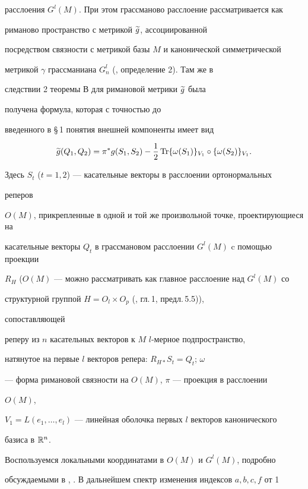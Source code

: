 расслоения $G^l(M)$. При этом грассманово расслоение рассматривается как


риманово пространство с метрикой $\widetilde {g}$, ассоциированной


посредством связности с метрикой базы $M$ и канонической симметрической


метрикой $\gamma $ грассманиана $G^l_n$ (\cite{Far1}, определение 2). Там же в


следствии 2 теоремы В для римановой метрики $\widetilde {g}$ была


получена формула, которая с точностью до


введенного в \S\,1 понятия внешней компоненты имеет вид


\begin{equation}


\g g(Q_1,Q_2)=\pi ^\ast g(S_1,S_2)-\1 \Tr \{ \omega (S_1)


\} _{V_1}\circ \{ \omega (S_2)\} _{V_1}.


\end{equation}


Здесь $S_t$ ($t=1,2$) --- касательные векторы в расслоении ортонормальных


реперов


$O(M)$, прикрепленные в одной и той же произвольной точке, проектирующиеся на


касательные векторы $Q_t$ в грассмановом расслоении $G^l(M)$ c помощью проекции


$R_H$ ($O(M)$ --- можно рассматривать как главное расслоение над $G^l(M)$ со


структурной группой $H=O_l\times O_p$ (\cite{Kob1}, гл.\,1, предл.\,5.5)),


сопоставляющей


реперу из $n$ касательных векторов к $M$ $l$-мерное подпространство,


натянутое на первые $l$ векторов репера: $R_{H*}S_t=Q_t$; $\omega $


--- форма римановой связности на $O(M)$, $\pi $ --- проекция в расслоении


$O(M)$,


$V_1=L(e_1,\dotsc,e_l)$ --- линейная оболочка первых $l$ векторов канонического


базиса в $\Bbb R^n$.





Воспользуемся локальными координатами в $O(M)$ и $G^l(M)$, подробно


обсуждаемыми в \cite{Far1}, \cite{Far2}. В дальнейшем спектр изменения индексов $a, b, c, f$ от 1


